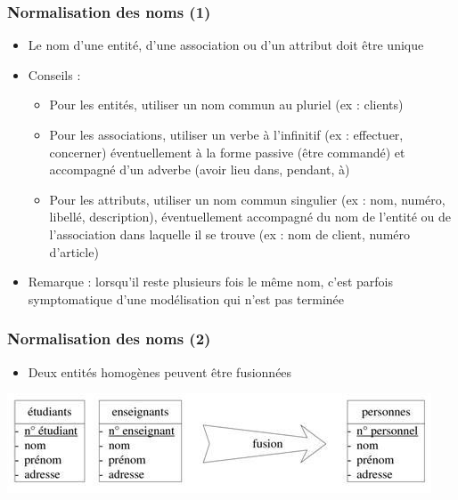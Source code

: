 \begin{frame}
  \frametitle{Normalisation des noms (1)}
  \begin{itemize}
    \item Le nom d'une entité, d'une association ou d'un attribut doit être unique
    \item Conseils :
      \begin{itemize}
        \item Pour les entités, utiliser un nom commun au pluriel (ex : clients)
        \item Pour les associations, utiliser un verbe à l'infinitif (ex : effectuer, concerner)
          éventuellement à la forme passive (être commandé) et accompagné d'un adverbe (avoir lieu dans,
          pendant, à)
        \item Pour les attributs, utiliser un nom commun singulier (ex : nom, numéro, libellé,
          description), éventuellement accompagné du nom de l'entité ou de l'association dans laquelle il se
          trouve (ex : nom de client, numéro d'article)
      \end{itemize}
    \item Remarque : lorsqu'il reste plusieurs fois le même nom, c'est parfois symptomatique d'une modélisation qui
      n'est pas terminée
  \end{itemize}
\end{frame}

\begin{frame}
  \frametitle{Normalisation des noms (2)}
  \begin{itemize}
    \item Deux entités homogènes peuvent être fusionnées
  \end{itemize}
  \begin{center}
    \includegraphics[width=0.8\linewidth]{fusion_entites.jpg}
  \end{center}
\end{frame}

